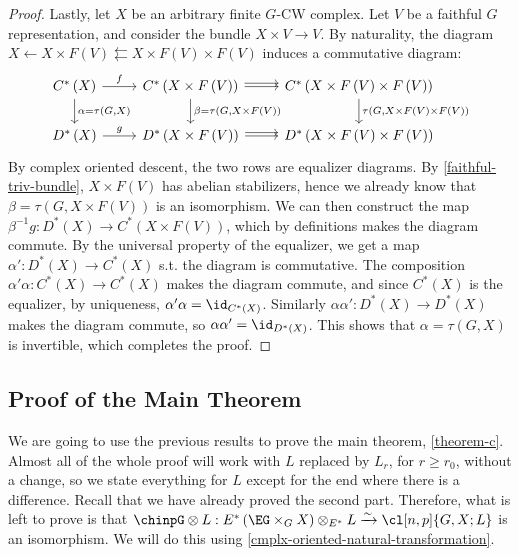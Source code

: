 \begin{proof}
	Lastly, let $X$ be an arbitrary finite $G$-CW complex.
	Let $V$ be a faithful $G$ representation, and consider the bundle $X \times V \to V$.
	By naturality, the diagram $X \leftarrow X \times F\left(V\right) \leftleftarrows X \times F\left(V\right) \times F\left(V\right)$ induces a commutative diagram:
	$$
	\begin{tikzcd}
		C^*\left(X\right) \arrow{r}{f} \arrow{d}{\alpha = \tau\left(G, X\right)}
		& C^*\left(X \times F\left(V\right)\right) \arrow{r}{} \arrow[shift left]{r}{} \arrow{d}{\beta = \tau\left(G, X \times F\left(V\right)\right)}
		& C^*\left(X \times F\left(V\right) \times F\left(V\right)\right) \arrow{d}{\tau\left(G, X \times F\left(V\right) \times F\left(V\right)\right)}
		\\
		D^*\left(X\right) \arrow{r}{g}
		& D^*\left(X \times F\left(V\right)\right) \arrow{r}{} \arrow[shift left]{r}{}
		& D^*\left(X \times F\left(V\right) \times F\left(V\right)\right)
	\end{tikzcd}
	$$
	By complex oriented descent, the two rows are equalizer diagrams.
	By \ref{faithful-triv-bundle}, $X \times F\left(V\right)$ has abelian stabilizers, hence we already know that $\beta = \tau\left(G, X \times F\left(V\right)\right)$ is an isomorphism.
	We can then construct the map $\beta^{-1} g: D^*\left(X\right) \to C^*\left(X \times F\left(V\right)\right)$, which by definitions makes the diagram commute.
	By the universal property of the equalizer, we get a map $\alpha': D^*\left(X\right) \to C^*\left(X\right)$ s.t. the diagram is commutative.
	The composition $\alpha' \alpha: C^*\left(X\right) \to C^*\left(X\right)$ makes the diagram commute, and since $C^*\left(X\right)$ is the equalizer, by uniqueness, $\alpha' \alpha = \id_{C^*\left(X\right)}$.
	Similarly $\alpha \alpha': D^*\left(X\right) \to D^*\left(X\right)$ makes the diagram commute, so $\alpha \alpha' = \id_{D^*\left(X\right)}$.
	This shows that $\alpha = \tau\left(G, X\right)$ is invertible, which completes the proof.
\end{proof}



\subsection{Proof of the Main Theorem}

We are going to use the previous results to prove the main theorem, \ref{theorem-c}.
Almost all of the whole proof will work with $L$ replaced by $L_r$, for $r \geq r_0$, without a change, so we state everything for $L$ except for the end where there is a difference.
Recall that we have already proved the second part.
Therefore, what is left to prove is that 
$\chinpG \otimes L: E^*\left(\EG \times_G X\right) \otimes_{E^*} L \xrightarrow{\sim} \cl[n,p]{G,X; L}$
is an isomorphism.
We will do this using \ref{cmplx-oriented-natural-transformation}.

